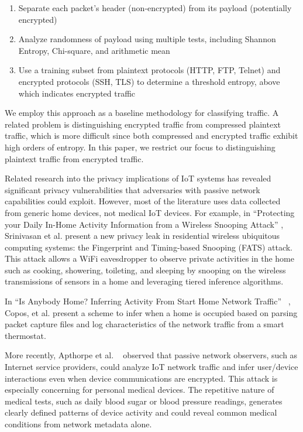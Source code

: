 \begin{enumerate}
  \item Separate each packet's header (non-encrypted) from its payload (potentially encrypted)
  \item Analyze randomness of payload using multiple tests, including Shannon Entropy, Chi-square, and arithmetic mean
  \item Use a training subset from plaintext protocols (HTTP, FTP, Telnet) and encrypted protocols (SSH, TLS) to determine a threshold entropy, above which indicates encrypted traffic
\end{enumerate}

We employ this approach as a baseline methodology for classifying traffic. A related problem is distinguishing encrypted traffic from compressed plaintext traffic, which is more difficult since both compressed and encrypted traffic exhibit high orders of entropy. In this paper, we restrict our focus to distinguishing plaintext traffic from encrypted traffic.  

Related research into the privacy implications of IoT systems has revealed significant privacy vulnerabilities that adversaries with passive network capabilities could exploit. However, most of the literature uses data collected from generic home devices, not medical IoT devices. For example, in ``Protecting your Daily In-Home Activity Information from a Wireless Snooping Attack'' \cite{srinivasan2008fats}, Srinivasan et al. present a new privacy leak in residential wireless ubiquitous computing systems: the Fingerprint and Timing-based Snooping (FATS) attack. This attack allows a WiFi eavesdropper to observe private activities in the home such as cooking, showering, toileting, and sleeping by snooping on the wireless transmissions of sensors in a home and leveraging tiered inference algorithms.

In ``Is Anybody Home? Inferring Activity From Start Home Network Traffic'' ~\cite{coposIoT}, Copos, et al. present a scheme to infer when a home is occupied based on parsing packet capture files and log characteristics of the network traffic from a smart thermostat. 

More recently, Apthorpe et al. ~\cite{apthorpeIoT} observed that passive network observers, such as Internet service providers, could analyze IoT network traffic and infer user/device interactions even when device communications are encrypted. 
This attack is especially concerning for personal medical devices. The repetitive nature of medical tests, such as daily blood sugar or blood pressure readings, generates clearly defined patterns of device activity and could reveal common medical conditions from network metadata alone. 

